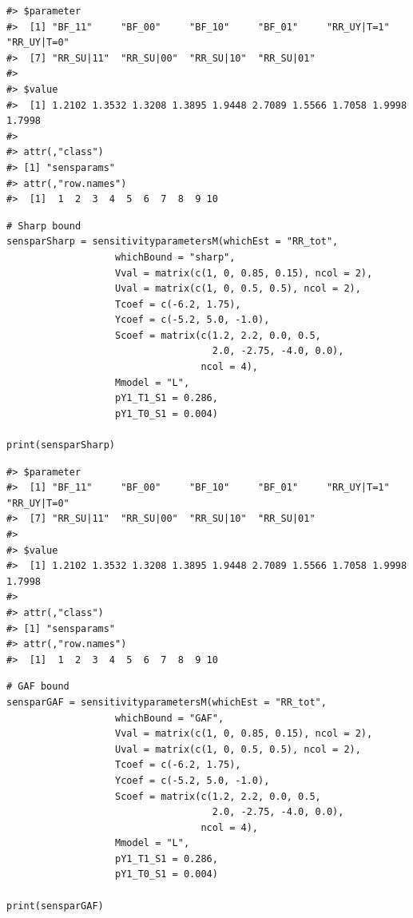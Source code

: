 \begin{verbatim}
#> $parameter
#>  [1] "BF_11"     "BF_00"     "BF_10"     "BF_01"     "RR_UY|T=1" "RR_UY|T=0"
#>  [7] "RR_SU|11"  "RR_SU|00"  "RR_SU|10"  "RR_SU|01" 
#> 
#> $value
#>  [1] 1.2102 1.3532 1.3208 1.3895 1.9448 2.7089 1.5566 1.7058 1.9998 1.7998
#> 
#> attr(,"class")
#> [1] "sensparams"
#> attr(,"row.names")
#>  [1]  1  2  3  4  5  6  7  8  9 10
\end{verbatim}

\begin{verbatim}
# Sharp bound
sensparSharp = sensitivityparametersM(whichEst = "RR_tot",
                   whichBound = "sharp",
                   Vval = matrix(c(1, 0, 0.85, 0.15), ncol = 2),
                   Uval = matrix(c(1, 0, 0.5, 0.5), ncol = 2),
                   Tcoef = c(-6.2, 1.75),
                   Ycoef = c(-5.2, 5.0, -1.0),
                   Scoef = matrix(c(1.2, 2.2, 0.0, 0.5,
                                    2.0, -2.75, -4.0, 0.0),
                                  ncol = 4),
                   Mmodel = "L",
                   pY1_T1_S1 = 0.286,
                   pY1_T0_S1 = 0.004)

print(sensparSharp)
\end{verbatim}

\begin{verbatim}
#> $parameter
#>  [1] "BF_11"     "BF_00"     "BF_10"     "BF_01"     "RR_UY|T=1" "RR_UY|T=0"
#>  [7] "RR_SU|11"  "RR_SU|00"  "RR_SU|10"  "RR_SU|01" 
#> 
#> $value
#>  [1] 1.2102 1.3532 1.3208 1.3895 1.9448 2.7089 1.5566 1.7058 1.9998 1.7998
#> 
#> attr(,"class")
#> [1] "sensparams"
#> attr(,"row.names")
#>  [1]  1  2  3  4  5  6  7  8  9 10
\end{verbatim}

\begin{verbatim}
# GAF bound
sensparGAF = sensitivityparametersM(whichEst = "RR_tot",
                   whichBound = "GAF",
                   Vval = matrix(c(1, 0, 0.85, 0.15), ncol = 2),
                   Uval = matrix(c(1, 0, 0.5, 0.5), ncol = 2),
                   Tcoef = c(-6.2, 1.75),
                   Ycoef = c(-5.2, 5.0, -1.0),
                   Scoef = matrix(c(1.2, 2.2, 0.0, 0.5,
                                    2.0, -2.75, -4.0, 0.0),
                                  ncol = 4),
                   Mmodel = "L",
                   pY1_T1_S1 = 0.286,
                   pY1_T0_S1 = 0.004)

print(sensparGAF)
\end{verbatim}

